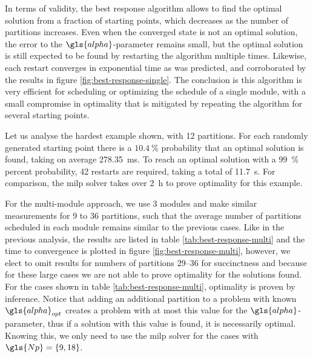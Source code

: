 \documentclass[main.tex]{subfiles}
\begin{document}
In terms of validity, the best response algorithm allows to find the optimal solution from a fraction of starting points, which decreases as the number of partitions increases.
Even when the converged state is not an optimal solution, the error to the $\gls{alpha}$-parameter remains small, but the optimal solution is still expected to be found by restarting the algorithm multiple times.
Likewise, each restart converges in exponential time as was predicted, and corroborated by the results in figure \ref{fig:best-response-single}.
The conclusion is this algorithm is very efficient for scheduling or optimizing the schedule of a single module, with a small compromise in optimality that is mitigated by repeating the algorithm for several starting points.

Let us analyse the hardest example shown, with \num{12} partitions.
For each randomly generated starting point there is a $\SI{10.4}{\percent}$ probability that an optimal solution is found, taking on average \SI{278.35}{\milli\second}.
To reach an optimal solution with a \SI{99}{\percent} percent probability, \si{42} restarts are required, taking a total of \SI{11.7}{\second}.
For comparison, the \gls{milp} solver takes over \SI{2}{\hour} to prove optimality for this example.

For the multi-module approach, we use \num{3} modules and make similar measurements for \num{9} to \num{36} partitions, such that the average number of partitions scheduled in each module remains similar to the previous cases.
Like in the previous analysis, the results are listed in table \ref{tab:best-response-multi} and the time to convergence is plotted in figure \ref{fig:best-response-multi}, however, we elect to omit results for numbers of partitions \numrange{29}{36} for succinctness and because for these large cases we are not able to prove optimality for the solutions found.
For the cases shown in table \ref{tab:best-response-multi}, optimality is proven by inference.
Notice that adding an additional partition to a problem with known $\gls{alpha}_{opt}$ creates a problem with at most this value for the $\gls{alpha}$-parameter, thus if a solution with this value is found, it is necessarily optimal.
Knowing this, we only need to use the \gls{milp} solver for the cases with $\gls{Np}=\braces{9,18}$.
\end{document}
